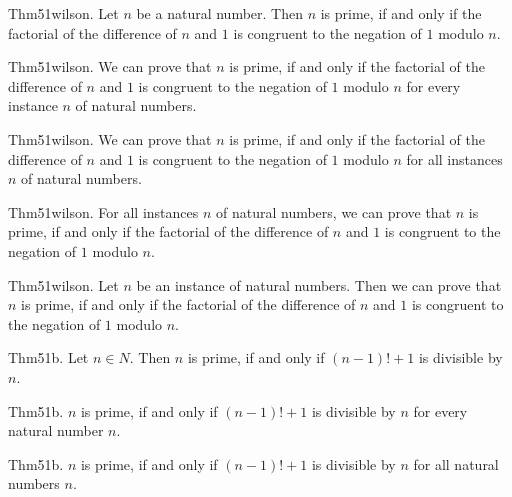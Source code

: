 \documentclass{article}
\begin{document}
Thm51wilson. Let $n$ be a natural number. Then $n$ is prime, if and only if the factorial of the difference of $n$ and $1$ is congruent to the negation of $1$ modulo $n$.

Thm51wilson. We can prove that $n$ is prime, if and only if the factorial of the difference of $n$ and $1$ is congruent to the negation of $1$ modulo $n$ for every instance $n$ of natural numbers.

Thm51wilson. We can prove that $n$ is prime, if and only if the factorial of the difference of $n$ and $1$ is congruent to the negation of $1$ modulo $n$ for all instances $n$ of natural numbers.

Thm51wilson. For all instances $n$ of natural numbers, we can prove that $n$ is prime, if and only if the factorial of the difference of $n$ and $1$ is congruent to the negation of $1$ modulo $n$.

Thm51wilson. Let $n$ be an instance of natural numbers. Then we can prove that $n$ is prime, if and only if the factorial of the difference of $n$ and $1$ is congruent to the negation of $1$ modulo $n$.

Thm51b. Let $n \in N$. Then $n$ is prime, if and only if $(n - 1)! + 1$ is divisible by $n$.

Thm51b. $n$ is prime, if and only if $(n - 1)! + 1$ is divisible by $n$ for every natural number $n$.

Thm51b. $n$ is prime, if and only if $(n - 1)! + 1$ is divisible by $n$ for all natural numbers $n$.
\end{document}
